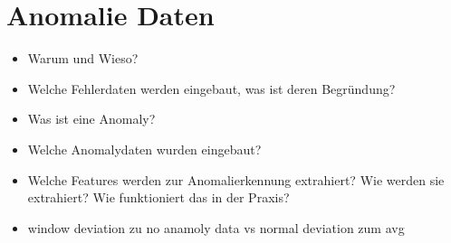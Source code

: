 \section{Anomalie Daten}
\label{sec:data_anomalie}
\begin{itemize}
    \item Warum und Wieso?
    \item Welche Fehlerdaten werden eingebaut, was ist deren Begründung?
    \item Was ist eine Anomaly?
    \item Welche Anomalydaten wurden eingebaut?
    \item Welche Features werden zur Anomalierkennung extrahiert? Wie werden sie extrahiert? Wie funktioniert das in der Praxis?
    \item window deviation zu no anamoly data vs normal deviation zum avg
\end{itemize}